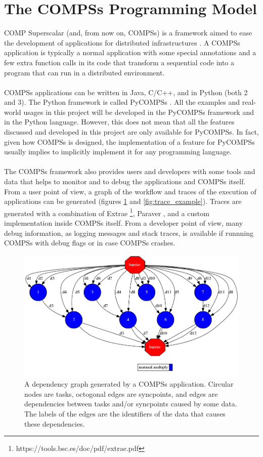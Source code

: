 \section{The COMPSs Programming Model}
\label{sec:compss}
COMP Superscalar (and, from now on, COMPSs) is a framework aimed to ease the development of applications for distributed infrastructures \cite{compss} \cite{Lordan2014}. A COMPSs application is typically a normal application with some special annotations and a few extra function calls in its code that transform a sequential code into a program that can run in a distributed environment.\\
\\
COMPSs applications can be written in Java, C/C++, and in Python (both 2 and 3). The Python framework is called PyCOMPSs \cite{pycompss}. All the examples and real-world usages in this project will be developed in the PyCOMPSs framework and in the Python language. However, this does not mean that all the features discussed and developed in this project are only available for PyCOMPSs. In fact, given how COMPSs is designed, the implementation of a feature for PyCOMPSs usually implies to implicitly implement it for any programming language.\\
\\
The COMPSs framework also provides users and developers with some tools and data that helps to monitor and to debug the applications and COMPSs itself. From a user point of view, a graph of the workflow and traces of the execution of applications can be generated (figures \ref{fig:graph_example}  and \ref{fig:trace_example}). Traces are generated with a combination of Extrae \footnote{https://tools.bsc.es/doc/pdf/extrae.pdf}, Paraver \cite{paraver}, and a custom implementation inside COMPSs itself. From a developer point of view, many debug information, as logging messages and stack traces, is available if runnning COMPSs with debug flags or in case COMPSs crashes.

\begin{figure}[ht!]
\centering
\includegraphics[scale = 0.45]{figures/2x2_matmul_graph.png}
\caption{A dependency graph generated by a COMPSs application. Circular nodes are tasks, octogonal edges are syncpoints, and edges are dependencies between tasks and/or syncpoints caused by some data. The labels of the edges are the identifiers of the data that causes these dependencies.}
\label{fig:graph_example}
\end{figure}

